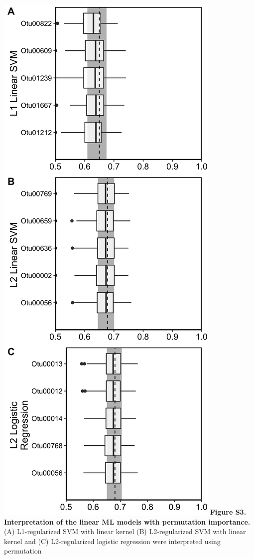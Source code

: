 \documentclass[11pt,]{article}
\begin{document}
\includegraphics{Figure_S4.png} \textbf{Figure S3. Interpretation of the
linear ML models with permutation importance.} (A) L1-regularized SVM
with linear kernel (B) L2-regularized SVM with linear kernel and (C)
L2-regularized logistic regression were interpreted using permutation
\end{document}
